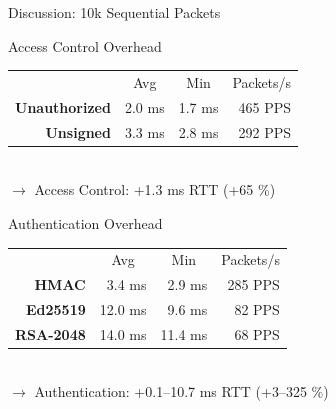 \documentclass[en]{sdqbeamer}
\begin{document}
\begin{frame}{Discussion: 10k Sequential Packets}
    \begin{blueblock}{Access Control Overhead}
        \begin{tabular}{r r r r}
            & \multicolumn{1}{c}{Avg} & \multicolumn{1}{c}{Min} & \multicolumn{1}{c}{Packets/s}\\
            \textbf{Unauthorized} & 2.0 ms & 1.7 ms & 465 PPS\\
            \textbf{Unsigned} & 3.3 ms & 2.8 ms & 292 PPS
        \end{tabular}
        \vspace{0.5em}
        \\$\rightarrow$ Access Control: +1.3 ms RTT (+65 \%)
    \end{blueblock}
    \begin{blueblock}{Authentication Overhead}
        \begin{tabular}{r r r r}
            & \multicolumn{1}{c}{Avg} & \multicolumn{1}{c}{Min} & \multicolumn{1}{c}{Packets/s}\\
            \textbf{HMAC} & 3.4 ms & 2.9 ms & 285 PPS\\
            \textbf{Ed25519} & 12.0 ms & 9.6 ms & 82 PPS\\
            \textbf{RSA-2048} & 14.0 ms & 11.4 ms & 68 PPS
        \end{tabular}
        \vspace{0.5em}
        \\$\rightarrow$ Authentication: +0.1--10.7 ms RTT (+3--325 \%)
    \end{blueblock}
\end{frame}
\end{document}
